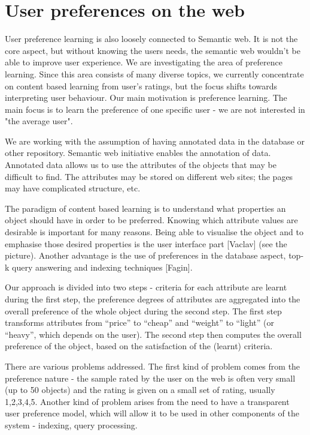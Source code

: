 \documentclass[runningheads,a4paper]{llncs}
\begin{document}
\section{User preferences on the web}
User preference learning is also loosely connected to Semantic web. It is not the core aspect, but without knowing the users needs, the semantic web wouldn't be able to improve user experience. We are investigating the area of preference learning. Since this area consists of many diverse topics, we currently concentrate on content based learning from user's ratings, but the focus shifts towards interpreting user behaviour. Our main motivation is preference learning. The main focus is to learn the preference of one specific user - we are not interested in "the average user".

 
We are working with the assumption of having annotated data in the database or other repository. Semantic web initiative enables the annotation of data. Annotated data allows us to use the attributes of the objects that may be difficult to find. The attributes may be stored on different web sites; the pages may have complicated structure, etc. 


The paradigm of content based learning is to understand what properties an object should have in order to be preferred. Knowing which attribute values are desirable is important for many reasons. Being able to visualise the object and to emphasise those desired properties is the user interface part [Vaclav] (see the picture). Another advantage is the use of preferences in the database aspect, top-k query answering and indexing techniques [Fagin]. 


Our approach is divided into two steps - criteria for each attribute are learnt during the first step, the preference degrees of attributes are aggregated into the overall preference of the whole object during the second step. The first step transforms attributes from ``price'' to ``cheap'' and ``weight'' to ``light'' (or ``heavy'', which depends on the user). The second step then computes the overall preference of the object, based on the satisfaction of the (learnt) criteria.


There are various problems addressed. The first kind of problem comes from the preference nature - the sample rated by the user on the web is often very small (up to 50 objects) and the rating is given on a small set of rating, usually 1,2,3,4,5. Another kind of problem arises from the need to have a transparent user preference model, which will allow it to be used in other components of the system - indexing, query processing.
\end{document}
